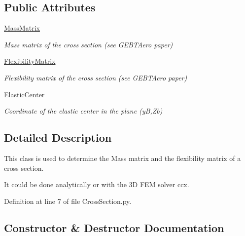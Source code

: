 \subsection*{Public Attributes}
\begin{DoxyCompactItemize}
\item 
\hyperlink{classgebtaero_1_1_cross_section_1_1_cross_section_ae9be8649853163b2b4dfdaa3584d9f78}{Mass\+Matrix}
\begin{DoxyCompactList}\small\item\em Mass matrix of the cross section (see G\+E\+B\+T\+Aero paper) \end{DoxyCompactList}\item 
\hyperlink{classgebtaero_1_1_cross_section_1_1_cross_section_ac20eafaf38ff757f9a8c9ae89212396a}{Flexibility\+Matrix}
\begin{DoxyCompactList}\small\item\em Flexibility matrix of the cross section (see G\+E\+B\+T\+Aero paper) \end{DoxyCompactList}\item 
\hyperlink{classgebtaero_1_1_cross_section_1_1_cross_section_a1eb436d0de5edf2c25612bbc15d88d91}{Elastic\+Center}
\begin{DoxyCompactList}\small\item\em Coordinate of the elastic center in the plane (yB,Zb) \end{DoxyCompactList}\end{DoxyCompactItemize}


\subsection{Detailed Description}
This class is used to determine the Mass matrix and the flexibility matrix of a cross section. 

It could be done analytically or with the 3D F\+EM solver ccx. 

Definition at line 7 of file Cross\+Section.\+py.



\subsection{Constructor \& Destructor Documentation}
\mbox{\label{classgebtaero_1_1_cross_section_1_1_cross_section_a26142f8a77b098b8725d7d024cfd5199}} 
